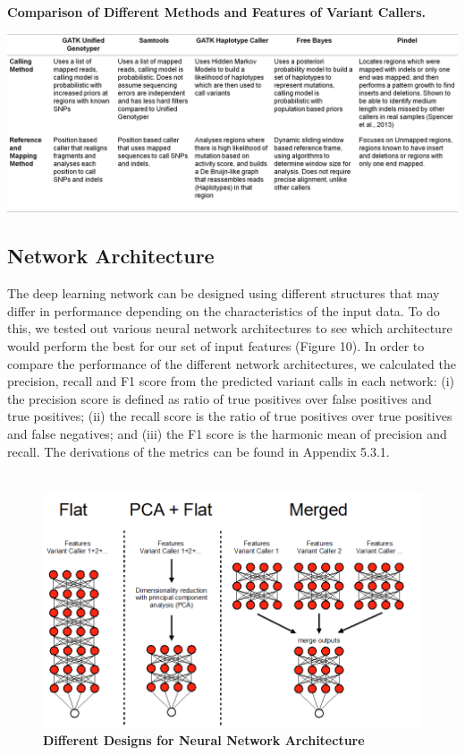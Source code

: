 \documentclass{article}
\begin{document}
\begin{table}[H]
\caption{\textbf{Comparison of Different Methods and Features of Variant Callers.}}
\includegraphics[width=\textwidth]{analysisofvariantcallers.png}
\centering
\end{table}

\subsection{Network Architecture}
The deep learning network can be designed using different structures that may differ in performance depending on the characteristics of the input data.  To do this, we tested out various neural network architectures to see which architecture would perform the best for our set of input features (Figure 10). In order to compare the performance of the different network architectures, we calculated the precision, recall and F1 score from the predicted variant calls in each network: (i) the precision score is defined as ratio of true positives over false positives and true positives; (ii) the recall score is the ratio of true positives over true positives and false negatives; and (iii) the F1 score is the harmonic mean of precision and recall. The derivations of the metrics can be found in Appendix 5.3.1.\\\\ 

\begin{figure}[H]
\includegraphics[width=\textwidth]{neuralnetworkstructure.png}
\centering
\caption{\textbf{Different Designs for Neural Network Architecture}}
\end{figure}
\end{document}
